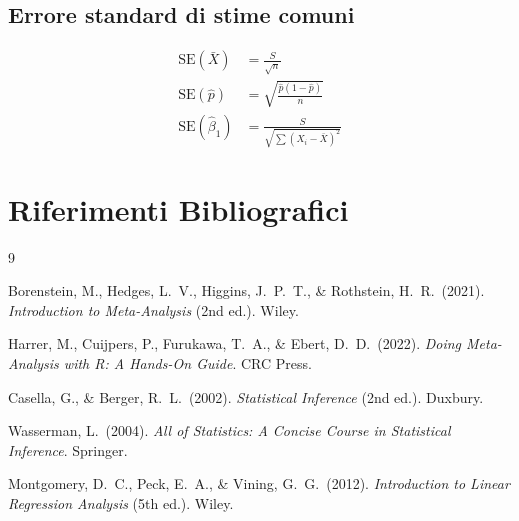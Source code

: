 \documentclass[12pt, a4paper]{article}
\begin{document}
\subsection*{Errore standard di stime comuni}
\begin{align*}
  \text{SE}(\bar{X}) &= \frac{S}{\sqrt{n}} \\[4pt]
  \text{SE}(\hat{p}) &= \sqrt{\frac{\hat{p}(1-\hat{p})}{n}} \\[4pt]
  \text{SE}(\hat\beta_1) &= \frac{S}{\sqrt{\sum(X_i - \bar{X})^2}}
\end{align*}

\section*{Riferimenti Bibliografici}

\begin{thebibliography}{9}

  Borenstein, M., Hedges, L.~V., Higgins, J.~P.~T., \& Rothstein, H.~R.\ (2021).
  \textit{Introduction to Meta-Analysis} (2nd ed.).
  Wiley.

  Harrer, M., Cuijpers, P., Furukawa, T.~A., \& Ebert, D.~D.\ (2022).
  \textit{Doing Meta-Analysis with R: A Hands-On Guide}.
  CRC Press.

  Casella, G., \& Berger, R.~L.\ (2002).
  \textit{Statistical Inference} (2nd ed.).
  Duxbury.

  Wasserman, L.\ (2004).
  \textit{All of Statistics: A Concise Course in Statistical Inference}.
  Springer.

  Montgomery, D.~C., Peck, E.~A., \& Vining, G.~G.\ (2012).
  \textit{Introduction to Linear Regression Analysis} (5th ed.).
  Wiley.

\end{thebibliography}
\end{document}
